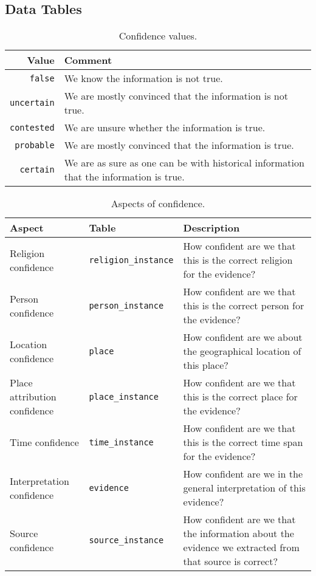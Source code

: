 \subsection{Data Tables}
\label{sec:data-tables}

\begin{table}[htb]
  \centering
  \caption{Confidence values.}
  \label{table:confidence-values}
  \begin{tabular}{@{}rl@{}}
    \toprule
    Value & Comment \\
    \midrule
    \verb!false! & We know the information is not true. \\
    \verb!uncertain! & We are mostly convinced that the information is not true. \\
    \verb!contested! & We are unsure whether the information is true. \\
    \verb!probable! & We are mostly convinced that the information is true. \\
    \verb!certain! & We are as sure as one can be with historical information that the information is true. \\
    \bottomrule
  \end{tabular}
\end{table}

\begin{table}[htb]
  \centering
  \caption{Aspects of confidence.}
  \label{table:confidence-aspects}
  \begin{tabular}{@{}llp{8.5cm}@{}}
    \toprule
    Aspect & Table & Description \\
    \midrule
    Religion confidence & \verb!religion_instance! & How confident are we that this is the correct religion for the evidence? \\
    Person confidence & \verb!person_instance! & How confident are we that this is the correct person for the evidence? \\
    Location confidence & \verb!place! & How confident are we about the geographical location of this place? \\
    Place attribution confidence & \verb!place_instance! & How confident are we that this is the correct place for the evidence? \\
    Time confidence & \verb!time_instance! & How confident are we that this is the correct time span for the evidence? \\
    Interpretation confidence & \verb!evidence! & How confident are we in the general interpretation of this evidence? \\
    Source confidence & \verb!source_instance! & How confident are we that the information about the evidence we extracted from that source is correct? \\
    \bottomrule
  \end{tabular}
\end{table}

